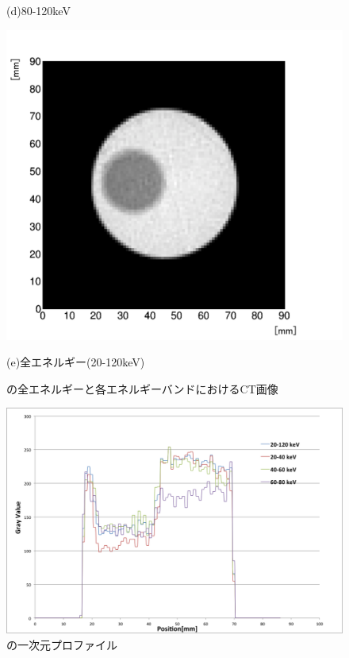 \begin{figure}[H]
\begin{minipage}{0.5\hsize}
\begin{center}
  \end{center}
\vspace{-1cm}
\caption*{(d)80-120keV}
 \end{minipage}
 \begin{minipage}{0.5\hsize}
  \begin{center}
   \includegraphics[bb=0.000000 0.000000 586.511515 539.955364,width=1.0\hsize]{image2/chapter5/low_contrast_20-120.png}
  \end{center}  
\vspace{-1cm}
\caption*{(e)全エネルギー(20-120keV)}
 \end{minipage}
 \begin{center}
  \caption{の全エネルギーと各エネルギーバンドにおけるCT画像}
  \label{fig:low_contrast_multi}
  \end{center}
\end{figure}


\begin{figure}[H]
 \begin{center}
 \includegraphics[bb=0.000000 0.000000 752.097827 504.438300,width=0.7\hsize]{image2/chapter5/Low_Con_slice.png} 
 \end{center}
 \caption{の一次元プロファイル}
 \label{fig:Low_Con_slice}
\end{figure}


